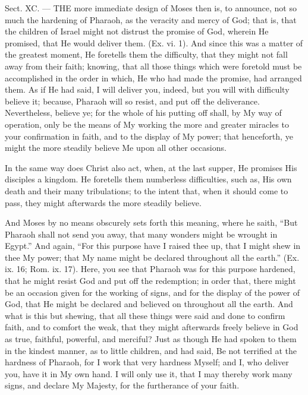 
Sect. XC. — THE more immediate design of Moses then is, to announce, not so much the hardening of Pharaoh, as the veracity and mercy of God; that is, that the children of Israel might not distrust the promise of God, wherein He promised, that He would deliver them. (Ex. vi. 1). And since this was a matter of the greatest moment, He foretells them the difficulty, that they might not fall away from their faith; knowing, that all those things which were foretold must be accomplished in the order in which, He who had made the promise, had arranged them. As if He had said, I will deliver you, indeed, but you will with difficulty believe it; because, Pharaoh will so resist, and put off the deliverance. Nevertheless, believe ye; for the whole of his putting off shall, by My way of operation, only be the means of My working the more and greater miracles to your confirmation in faith, and to the display of My power; that henceforth, ye might the more steadily believe Me upon all other occasions.

In the same way does Christ also act, when, at the last supper, He promises His disciples a kingdom. He foretells them numberless difficulties, such as, His own death and their many tribulations; to the intent that, when it should come to pass, they might afterwards the more steadily believe.

And Moses by no means obscurely sets forth this meaning, where he saith, “But Pharaoh shall not send you away, that many wonders might be wrought in Egypt.” And again, “For this purpose have I raised thee up, that I might shew in thee My power; that My name might be declared throughout all the earth.” (Ex. ix. 16; Rom. ix. 17). Here, you see that Pharaoh was for this purpose hardened, that he might resist God and put off the redemption; in order that, there might be an occasion given for the working of signs, and for the display of the power of God, that He might be declared and believed on throughout all the earth. And what is this but shewing, that all these things were said and done to confirm faith, and to comfort the weak, that they might afterwards freely believe in God as true, faithful, powerful, and merciful? Just as though He had spoken to them in the kindest manner, as to little children, and had said, Be not terrified at the hardness of Pharaoh, for I work that very hardness Myself; and I, who deliver you, have it in My own hand. I will only use it, that I may thereby work many signs, and declare My Majesty, for the furtherance of your faith.

